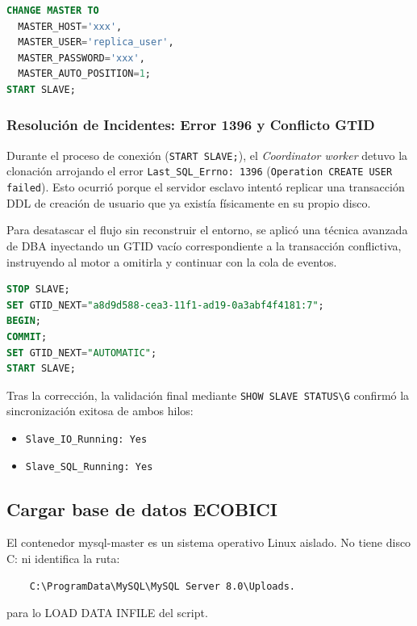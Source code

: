 \documentclass[10pt,a4paper]{article}
\begin{document}
\begin{lstlisting}[language=SQL]
CHANGE MASTER TO
  MASTER_HOST='xxx',
  MASTER_USER='replica_user',
  MASTER_PASSWORD='xxx',
  MASTER_AUTO_POSITION=1;
START SLAVE;
\end{lstlisting}

\subsubsection{Resolución de Incidentes: Error 1396 y Conflicto GTID}
Durante el proceso de conexión (\texttt{START SLAVE;}), el \textit{Coordinator worker} detuvo la clonación arrojando el error \texttt{Last\_SQL\_Errno: 1396} (\texttt{Operation CREATE USER failed}). Esto ocurrió porque el servidor esclavo intentó replicar una transacción DDL de creación de usuario que ya existía físicamente en su propio disco.

Para desatascar el flujo sin reconstruir el entorno, se aplicó una técnica avanzada de DBA inyectando un GTID vacío correspondiente a la transacción conflictiva, instruyendo al motor a omitirla y continuar con la cola de eventos.

\begin{lstlisting}[language=SQL]
STOP SLAVE;
SET GTID_NEXT="a8d9d588-cea3-11f1-ad19-0a3abf4f4181:7";
BEGIN;
COMMIT;
SET GTID_NEXT="AUTOMATIC";
START SLAVE;
\end{lstlisting}

Tras la corrección, la validación final mediante \texttt{SHOW SLAVE STATUS\textbackslash G} confirmó la sincronización exitosa de ambos hilos:
\begin{itemize}
    \item \texttt{Slave\_IO\_Running: Yes}
    \item \texttt{Slave\_SQL\_Running: Yes}
\end{itemize}

\newpage
\subsection{Cargar base de datos ECOBICI}

El contenedor mysql-master es un sistema operativo Linux aislado. No tiene disco C: ni identifica la ruta:
\begin{lstlisting}
    C:\ProgramData\MySQL\MySQL Server 8.0\Uploads.
\end{lstlisting}

para lo LOAD DATA INFILE del script.

\vspace{2mm}
\end{document}
